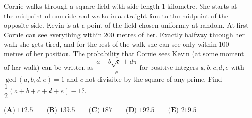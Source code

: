 Cornie walks through a square field with side length $1$ kilometre. She starts at the midpoint of one side and walks in a straight line to the midpoint of the opposite side. Kevin is at a point of the field chosen uniformly at random. At first Cornie can see everything within $200$ metres of her. Exactly halfway through her walk she gets tired, and for the rest of the walk she can see only within $100$ metres of her position. The probability that Cornie sees Kevin (at some moment of her walk) can be written as $\dfrac{a-b\sqrt c+d\pi}{e}$ for positive integers $a,b,c,d,e$ with $\gcd(a,b,d,e)=1$ and $c$ not divisible by the square of any prime. Find $\dfrac12(a+b+c+d+e)-13$.

$\textbf{(A) }112.5\qquad\textbf{(B) }139.5\qquad\textbf{(C) }187\qquad\textbf{(D) }192.5\qquad\textbf{(E) }219.5$
